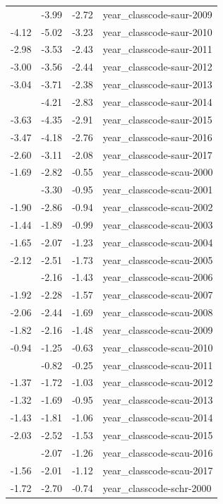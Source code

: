 \documentclass[]{article}
\begin{document}
\begin{longtable}[t]{rrrl}
\addlinespace
-3.35 & -3.99 & -2.72 & year\_classcode-saur-2009\\
-4.12 & -5.02 & -3.23 & year\_classcode-saur-2010\\
-2.98 & -3.53 & -2.43 & year\_classcode-saur-2011\\
-3.00 & -3.56 & -2.44 & year\_classcode-saur-2012\\
-3.04 & -3.71 & -2.38 & year\_classcode-saur-2013\\
\addlinespace
-3.52 & -4.21 & -2.83 & year\_classcode-saur-2014\\
-3.63 & -4.35 & -2.91 & year\_classcode-saur-2015\\
-3.47 & -4.18 & -2.76 & year\_classcode-saur-2016\\
-2.60 & -3.11 & -2.08 & year\_classcode-saur-2017\\
-1.69 & -2.82 & -0.55 & year\_classcode-scau-2000\\
\addlinespace
-2.12 & -3.30 & -0.95 & year\_classcode-scau-2001\\
-1.90 & -2.86 & -0.94 & year\_classcode-scau-2002\\
-1.44 & -1.89 & -0.99 & year\_classcode-scau-2003\\
-1.65 & -2.07 & -1.23 & year\_classcode-scau-2004\\
-2.12 & -2.51 & -1.73 & year\_classcode-scau-2005\\
\addlinespace
-1.79 & -2.16 & -1.43 & year\_classcode-scau-2006\\
-1.92 & -2.28 & -1.57 & year\_classcode-scau-2007\\
-2.06 & -2.44 & -1.69 & year\_classcode-scau-2008\\
-1.82 & -2.16 & -1.48 & year\_classcode-scau-2009\\
-0.94 & -1.25 & -0.63 & year\_classcode-scau-2010\\
\addlinespace
-0.53 & -0.82 & -0.25 & year\_classcode-scau-2011\\
-1.37 & -1.72 & -1.03 & year\_classcode-scau-2012\\
-1.32 & -1.69 & -0.95 & year\_classcode-scau-2013\\
-1.43 & -1.81 & -1.06 & year\_classcode-scau-2014\\
-2.03 & -2.52 & -1.53 & year\_classcode-scau-2015\\
\addlinespace
-1.66 & -2.07 & -1.26 & year\_classcode-scau-2016\\
-1.56 & -2.01 & -1.12 & year\_classcode-scau-2017\\
-1.72 & -2.70 & -0.74 & year\_classcode-schr-2000\\

\end{longtable}
\end{document}

